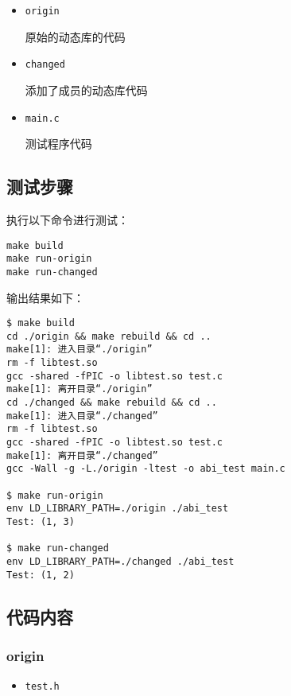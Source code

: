 \documentclass[a4paper,12pt]{article}
\begin{document}
\begin{itemize}
\item \texttt{origin}

原始的动态库的代码

\item \texttt{changed}

添加了成员的动态库代码

\item \texttt{main.c}

测试程序代码
\end{itemize}

\subsection{测试步骤}
\label{sec:org090bef6}

执行以下命令进行测试：

\begin{verbatim}
make build
make run-origin
make run-changed
\end{verbatim}

输出结果如下：
\begin{verbatim}
$ make build
cd ./origin && make rebuild && cd ..
make[1]: 进入目录“./origin”
rm -f libtest.so
gcc -shared -fPIC -o libtest.so test.c
make[1]: 离开目录“./origin”
cd ./changed && make rebuild && cd ..
make[1]: 进入目录“./changed”
rm -f libtest.so
gcc -shared -fPIC -o libtest.so test.c
make[1]: 离开目录“./changed”
gcc -Wall -g -L./origin -ltest -o abi_test main.c

$ make run-origin
env LD_LIBRARY_PATH=./origin ./abi_test
Test: (1, 3)

$ make run-changed
env LD_LIBRARY_PATH=./changed ./abi_test
Test: (1, 2)
\end{verbatim}

\newpage

\subsection{代码内容}
\label{sec:orgbc96ad9}

\subsubsection{origin}
\label{sec:org923fa06}

\begin{itemize}
\item \texttt{test.h}
\end{itemize}
\end{document}
